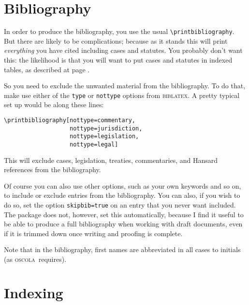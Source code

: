 \documentclass[a4paper,
               11pt,
	       DIV=1,			   
	       footinclude=false]
	      {scrartcl}
\newcommand{\biblatex}{\textsc{biblatex}}
\newcommand{\oscolashort}{\textsc{oscola}\nocite{oscola}}
\newcounter{egcounter}\setcounter{egcounter}{0}
\newlength{\boxwidth}
\newenvironment{bibexample}[1][]
{%
  \medskip\par\noindent\ignorespaces
  \marginpar{[\refstepcounter{egcounter}\arabic{egcounter}]\label{#1}}%
  \setlength{\boxwidth}{0.95\linewidth}%
  \addtolength{\boxwidth}{-2\fboxsep}
  \addtolength{\boxwidth}{-2\fboxrule}
  \begin{lrbox}{\boxcontainer}
  \begin{minipage}[t]{\boxwidth}%
}
{%
  \end{minipage}\end{lrbox}%
  \colorbox{gray!30}{\usebox{\boxcontainer}}
  \par\medskip}
\begin{document}
\section{Bibliography}

In order to produce the bibliography, you use the usual
\verb|\printbibliography|.
But there are likely to be complications;
because as it stands this will print \emph{everything} you have cited
including cases and statutes. You probably don't want this: the
likelihood is that you will want to put cases and statutes in indexed
tables, as described at page \pageref{indexing}.

So you need to exclude the unwanted material from the bibliography. To do that, make use either of the \texttt{type} or \texttt{nottype} options from \biblatex. A pretty typical set up would be along these lines:
\begin{bibexample}[bibliography]
\begin{verbatim}
\printbibliography[nottype=commentary,
                   nottype=jurisdiction,
                   nottype=legislation,
                   nottype=legal]
\end{verbatim}
\end{bibexample}
This will exclude cases, legislation, treaties, commentaries, and
Hansard references from the bibliography.

Of course you can also use other options, such as your own keywords
and so on, to include or exclude entries from the bibliography. You
can also, if you wish to do so, set the option \verb|skipbib=true| on
an entry that you never want included. The package does not, however,
set this automatically, because I find it useful to be able to produce
a full bibliography when working with draft documents, even if it is
trimmed down once writing and proofing is complete.

Note that in the bibliography, first names are abbreviated in all cases to initials (as \oscolashort\ requires).

\section{Indexing\label{indexing}}
\end{document}
